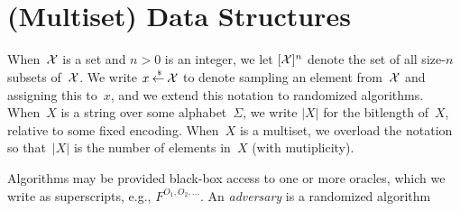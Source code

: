 \section{(Multiset) Data Structures}

 When~${\cal X}$ is a set and $n>0$ is an
integer, we let $[{\cal X}]^n$ denote the set of all size-$n$ subsets
of~${\cal X}$. We write $x {\:\stackrel{{\scriptscriptstyle \hspace{0.2em}\$}} {\leftarrow}\:} {\cal X}$ to denote
sampling an element from~${\cal X}$ and assigning this to~$x$, and we
extend this notation to randomized algorithms.  When~$X$ is a string
over some alphabet~$\Sigma$, we write $|X|$ for the bitlength
of~$X$, relative to some fixed encoding.  When~$X$ is a multiset, we
overload the notation so that~$|X|$ is the number of elements in~$X$
(with mutiplicity).

Algorithms may be provided black-box access to one or more oracles, which we write as superscripts, e.g., $F^{O_1,O_2,\ldots}$.  An \emph{adversary} is a randomized algorithm

